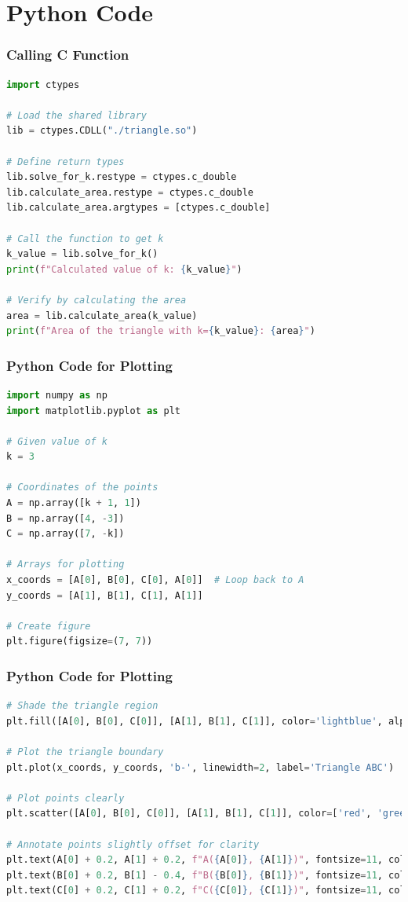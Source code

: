 \documentclass{beamer}
\theoremstyle{remark}
\numberwithin{equation}{section}
\begin{document}
\section{Python Code}
\begin{frame}[fragile]
\frametitle{Calling C Function}
\begin{lstlisting}[language=Python]
import ctypes

# Load the shared library
lib = ctypes.CDLL("./triangle.so")

# Define return types
lib.solve_for_k.restype = ctypes.c_double
lib.calculate_area.restype = ctypes.c_double
lib.calculate_area.argtypes = [ctypes.c_double]

# Call the function to get k
k_value = lib.solve_for_k()
print(f"Calculated value of k: {k_value}")

# Verify by calculating the area
area = lib.calculate_area(k_value)
print(f"Area of the triangle with k={k_value}: {area}")
\end{lstlisting}
\end{frame}

\begin{frame}[fragile]
\frametitle{Python Code for Plotting}
\begin{lstlisting}[language=Python]
import numpy as np
import matplotlib.pyplot as plt

# Given value of k
k = 3

# Coordinates of the points
A = np.array([k + 1, 1])
B = np.array([4, -3])
C = np.array([7, -k])

# Arrays for plotting
x_coords = [A[0], B[0], C[0], A[0]]  # Loop back to A
y_coords = [A[1], B[1], C[1], A[1]]

# Create figure
plt.figure(figsize=(7, 7))

\end{lstlisting}
\end{frame}

\begin{frame}[fragile]
\frametitle{Python Code for Plotting}
\begin{lstlisting}[language=Python]
# Shade the triangle region
plt.fill([A[0], B[0], C[0]], [A[1], B[1], C[1]], color='lightblue', alpha=0.5, label='Region ABC')

# Plot the triangle boundary
plt.plot(x_coords, y_coords, 'b-', linewidth=2, label='Triangle ABC')

# Plot points clearly
plt.scatter([A[0], B[0], C[0]], [A[1], B[1], C[1]], color=['red', 'green', 'purple'], s=80, zorder=5)

# Annotate points slightly offset for clarity
plt.text(A[0] + 0.2, A[1] + 0.2, f"A({A[0]}, {A[1]})", fontsize=11, color='red', weight='bold')
plt.text(B[0] + 0.2, B[1] - 0.4, f"B({B[0]}, {B[1]})", fontsize=11, color='green', weight='bold')
plt.text(C[0] + 0.2, C[1] + 0.2, f"C({C[0]}, {C[1]})", fontsize=11, color='purple', weight='bold')


\end{lstlisting}
\end{frame}
\end{document}
